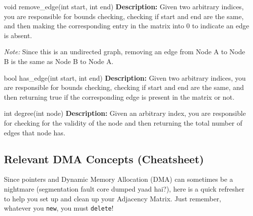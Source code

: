 \documentclass[11pt]{article}
\begin{document}
\begin{methodbox}{void remove\_edge(int start, int end)}
\textbf{Description:} Given two arbitrary indices, you are responsible for bounds checking, checking if start and end are the same, and then making the corresponding entry in the matrix into 0 to indicate an edge is absent. 

\textit{Note:} Since this is an undirected graph, removing an edge from Node A to Node B is the same as Node B to Node A.
\end{methodbox}

\begin{methodbox}{bool has\_edge(int start, int end)}
\textbf{Description:} Given two arbitrary indices, you are responsible for bounds checking, checking if start and end are the same, and then returning true if the corresponding edge is present in the matrix or not.
\end{methodbox}

\begin{methodbox}{int degree(int node)}
\textbf{Description:} Given an arbitrary index, you are responsible for checking for the validity of the node and then returning the total number of edges that node has.
\end{methodbox}

\subsection{Relevant DMA Concepts (Cheatsheet)}

Since pointers and Dynamic Memory Allocation (DMA) can sometimes be a nightmare (segmentation fault core dumped yaad hai?), here is a quick refresher to help you set up and clean up your Adjacency Matrix. Just remember, whatever you \texttt{new}, you must \texttt{delete}!
\end{document}

